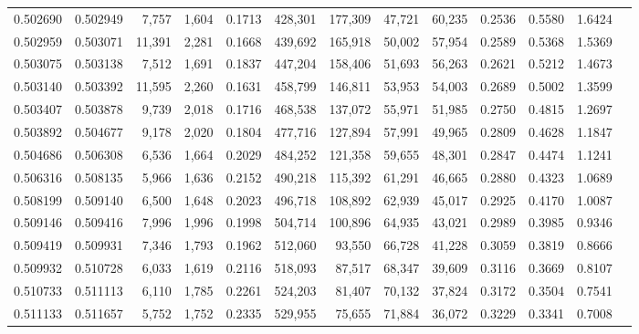 \begin{tabular}{rrrrrrrrrrrrr}
0.502690 & 0.502949 &  7,757 & 1,604 &                                     0.1713 & 428,301 & 177,309 &  47,721 &  60,235 & 0.2536 & 0.5580 & 1.6424 \\
0.502959 & 0.503071 & 11,391 & 2,281 &                                     0.1668 & 439,692 & 165,918 &  50,002 &  57,954 & 0.2589 & 0.5368 & 1.5369 \\
0.503075 & 0.503138 &  7,512 & 1,691 &                                     0.1837 & 447,204 & 158,406 &  51,693 &  56,263 & 0.2621 & 0.5212 & 1.4673 \\
0.503140 & 0.503392 & 11,595 & 2,260 &                                     0.1631 & 458,799 & 146,811 &  53,953 &  54,003 & 0.2689 & 0.5002 & 1.3599 \\
0.503407 & 0.503878 &  9,739 & 2,018 &                                     0.1716 & 468,538 & 137,072 &  55,971 &  51,985 & 0.2750 & 0.4815 & 1.2697 \\
0.503892 & 0.504677 &  9,178 & 2,020 &                                     0.1804 & 477,716 & 127,894 &  57,991 &  49,965 & 0.2809 & 0.4628 & 1.1847 \\
0.504686 & 0.506308 &  6,536 & 1,664 &                                     0.2029 & 484,252 & 121,358 &  59,655 &  48,301 & 0.2847 & 0.4474 & 1.1241 \\
0.506316 & 0.508135 &  5,966 & 1,636 &                                     0.2152 & 490,218 & 115,392 &  61,291 &  46,665 & 0.2880 & 0.4323 & 1.0689 \\
0.508199 & 0.509140 &  6,500 & 1,648 &                                     0.2023 & 496,718 & 108,892 &  62,939 &  45,017 & 0.2925 & 0.4170 & 1.0087 \\
0.509146 & 0.509416 &  7,996 & 1,996 &                                     0.1998 & 504,714 & 100,896 &  64,935 &  43,021 & 0.2989 & 0.3985 & 0.9346 \\
0.509419 & 0.509931 &  7,346 & 1,793 &                                     0.1962 & 512,060 &  93,550 &  66,728 &  41,228 & 0.3059 & 0.3819 & 0.8666 \\
0.509932 & 0.510728 &  6,033 & 1,619 &                                     0.2116 & 518,093 &  87,517 &  68,347 &  39,609 & 0.3116 & 0.3669 & 0.8107 \\
0.510733 & 0.511113 &  6,110 & 1,785 &                                     0.2261 & 524,203 &  81,407 &  70,132 &  37,824 & 0.3172 & 0.3504 & 0.7541 \\
0.511133 & 0.511657 &  5,752 & 1,752 &                                     0.2335 & 529,955 &  75,655 &  71,884 &  36,072 & 0.3229 & 0.3341 & 0.7008 \\

\end{tabular}

